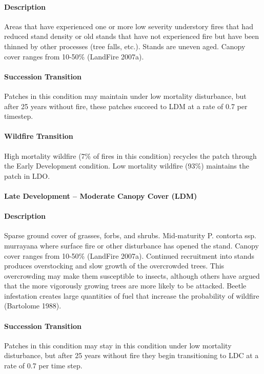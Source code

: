 \paragraph{Description} Areas that have experienced one or more low severity understory fires that had reduced stand density or old stands that have not experienced fire but have been thinned by other processes (tree falls, etc.). Stands are uneven aged. Canopy cover ranges from 10-50\% (LandFire 2007a).

\paragraph{Succession Transition} Patches in this condition may maintain under low mortality disturbance, but after 25 years without fire, these patches succeed to LDM at a rate of 0.7 per timestep.

\paragraph{Wildfire Transition} High mortality wildfire (7\% of fires in this condition) recycles the patch through the Early Development condition. Low mortality wildfire (93\%) maintains the patch in LDO.

\noindent\hrulefill

\paragraph{Late Development – Moderate Canopy Cover (LDM)}

\paragraph{Description} Sparse ground cover of grasses, forbs, and shrubs. Mid-maturity P. contorta ssp. murrayana where surface fire or other disturbance has opened the stand. Canopy cover ranges from 10-50\% (LandFire 2007a).
Continued recruitment into stands produces overstocking and slow growth of the overcrowded trees. This overcrowding may make them susceptible to insects, although others have argued that the more vigorously growing trees are more likely to be attacked. Beetle infestation creates large quantities of fuel that increase the probability of wildfire (Bartolome 1988).


\paragraph{Succession Transition} Patches in this condition may stay in this condition under low mortality disturbance, but after 25 years without fire they begin transitioning to LDC at a rate of 0.7 per time step. 


